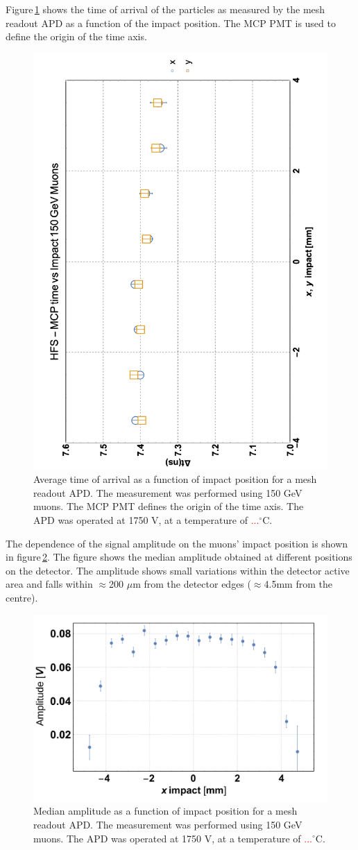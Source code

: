 \documentclass{article}
\begin{document}
Figure\,\ref{fig:toa8x8impact} shows the time of arrival of the particles as measured by the mesh readout APD as a function of the impact position.
The MCP PMT is used to define the origin of the time axis.
\begin{figure}
  \centering
  \includegraphics[width = 0.6 \textwidth]{toa8x8VsImpact}
  \caption{Average time of arrival as a function of impact position for a mesh readout APD. The measurement was performed using 150 GeV muons. The MCP PMT defines the origin of the time axis. The APD was operated at 1750 V, at a temperature of \textcolor{red}{...}$^\circ$C.}
  \label{fig:toa8x8impact}
\end{figure}

The dependence of the signal amplitude on the muons' impact position is shown in figure\,\ref{fig:ampli8x8impact}.
The figure shows the median amplitude obtained at different positions on the detector.
The amplitude shows small variations within the detector active area and falls within $\approx$200 $\mu$m from the detector edges ($\approx$4.5mm from the centre).
\begin{figure}
  \centering
  \includegraphics[width = 0.6 \textwidth]{ampli8x8vsImpact}
  \caption{Median amplitude as a function of impact position for a mesh readout APD. The measurement was performed using 150 GeV muons. The APD was operated at 1750 V, at a temperature of \textcolor{red}{...}$^\circ$C.}
  \label{fig:ampli8x8impact}
\end{figure}
\end{document}
